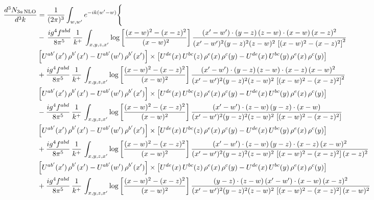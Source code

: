 \documentclass[9pt]{article}
\numberwithin{equation}{section}
\begin{document}
\begin{align}
\frac{d^{3}N_{3a\,\rm NLO}}{d^{3}k} & = \frac{1}{(2\pi)^{3}}\int_{w,w'}e^{-ik(w'-w)}\Bigg\{\notag \\
& -\,\frac{ig^{4}f^{abd}}{8\pi^{5}}\,\frac{1}{k^{+}}\,\int_{x,y,z,x'}\log{\left[\frac{(x-w)^{2}-(x-z)^{2}}{(x-w)^{2}}\right]}\,
\frac{(x'-w')\cdot(y-z)\,(z-w)\cdot(x-w)\,(x-z)^{2}}{(x'-w')^{2}(y-z)^{2}(z-w)^{2}\,\left[(x-w)^{2}-(x-z)^{2}\right]^{2}}\notag \\ & \left[U^{ab'}(x')\,\rho^{b'}(x')-U^{ab'}(w')\, \rho^{b'}(x')\right]\times \left[U^{de}(x)\,U^{bc}(z)\, \rho^{e}(x)\,\rho^{c}(y)-U^{de}(x)\,U^{bc}(y)\,\rho^{e}(x)\,\rho^{c}(y)\right] \notag \\
& +\frac{ig^{4}f^{abd}}{8\pi^{5}}\,\frac{1}{k^{+}}\,\int_{x,y,z,x'}\log{\left[\frac{(x-w)^{2}-(x-z)^{2}}{(x-w)^{2}}\right]}\,
\frac{(x'-w')\cdot(y-z)\,(z-w)\cdot(x-z)\,(x-w)^{2}}{(x'-w')^{2}(y-z)^{2}(z-w)^{2}\,\left[(x-w)^{2}-(x-z)^{2}\right]^{2}}\notag \\ 
&\left[U^{ab'}(x')\,\rho^{b'}(x')-U^{ab'}(w')\, \rho^{b'}(x')\right]\times \left[U^{de}(x)\,U^{bc}(z)\, \rho^{e}(x)\,\rho^{c}(y)-U^{de}(x)\,U^{bc}(y)\,\rho^{e}(x)\,\rho^{c}(y)\right] \notag \\
& -\frac{ig^{4}f^{abd}}{8\pi^{5}}\,\frac{1}{k^{+}}\,\int_{x,y,z,x'}\log{\left[\frac{(x-w)^{2}-(x-z)^{2}}{(x-w)^{2}}\right]}\,
\frac{(x'-w')\cdot(z-w)\,(y-z)\cdot(x-w)}{(x'-w')^{2}(y-z)^{2}(z-w)^{2}\,\left[(x-w)^{2}-(x-z)^{2}\right]}\notag \\ & \left[U^{ab'}(x')\,\rho^{b'}(x')-U^{ab'}(w')\, \rho^{b'}(x')\right]\times \left[U^{de}(x)\,U^{bc}(z)\, \rho^{e}(x)\,\rho^{c}(y)-U^{de}(x)\,U^{bc}(y)\,\rho^{e}(x)\,\rho^{c}(y)\right] \notag \\
&  +\frac{ig^{4}f^{abd}}{8\pi^{5}}\,\frac{1}{k^{+}}\,\int_{x,y,z,x'}\log{\left[\frac{(x-w)^{2}-(x-z)^{2}}{(x-w)^{2}}\right]}\,
\frac{(x'-w')\cdot(z-w)\,(y-z)\cdot(x-z)\,(x-w)^{2}}{(x'-w')^{2}(y-z)^{2}(z-w)^{2}\,\left[(x-w)^{2}-(x-z)^{2}\right](x-z)^{2}}\notag \\ & \left[U^{ab'}(x')\,\rho^{b'}(x')-U^{ab'}(w')\, \rho^{b'}(x')\right]\times \left[U^{de}(x)\,U^{bc}(z)\, \rho^{e}(x)\,\rho^{c}(y)-U^{de}(x)\,U^{bc}(y)\,\rho^{e}(x)\,\rho^{c}(y)\right] \notag \\
& +\frac{ig^{4}f^{abd}}{8\pi^{5}}\,\frac{1}{k^{+}}\,\int_{x,y,z,x'}\log{\left[\frac{(x-w)^{2}-(x-z)^{2}}{(x-w)^{2}}\right]}\,
\frac{(y-z)\cdot(z-w)\,(x'-w')\cdot(x-w)\,(x-z)^{2}}{(x'-w')^{2}(y-z)^{2}(z-w)^{2}\,\left[(x-w)^{2}-(x-z)^{2}\right](x-w)^{2}}\notag \\ 

\end{align}
\end{document}

